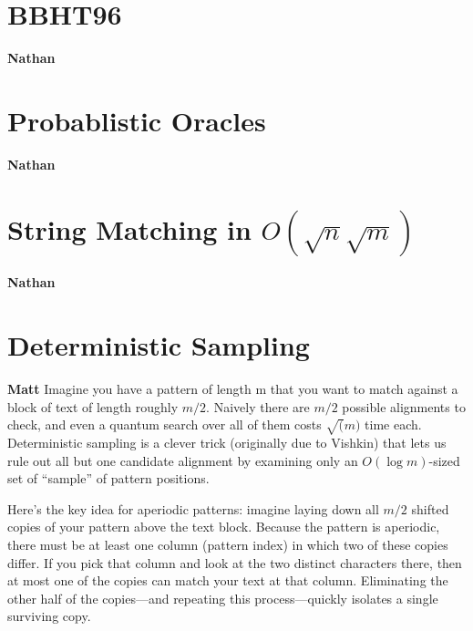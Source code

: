 \documentclass[11pt]{article}
\begin{document}
\section*{BBHT96}
\textbf{Nathan} \linebreak
\section*{Probablistic Oracles}
\textbf{Nathan} \linebreak
\section*{String Matching in \(O(\sqrt{n} \sqrt{m})\)}
\textbf{Nathan} \linebreak

\section*{Deterministic Sampling}
\textbf{Matt}\linebreak
Imagine you have a pattern of length m that you want to match against a block of text of length roughly \(m/2\). Naively there are \(m/2\) possible alignments to check, and even a quantum search over all of them costs \(\sqrt(m)\) time each. Deterministic sampling is a clever trick (originally due to Vishkin) that lets us rule out all but one candidate alignment by examining only an \(O(\log m)\)-sized set of ``sample'' of pattern positions.

Here's the key idea for aperiodic patterns: imagine laying down all \(m/2\) shifted copies of your pattern above the text block. Because the pattern is aperiodic, there must be at least one column (pattern index) in which two of these copies differ. If you pick that column and look at the two distinct characters there, then at most one of the copies can match your text at that column. Eliminating the other half of the copies—and repeating this process—quickly isolates a single surviving copy.
\end{document}
